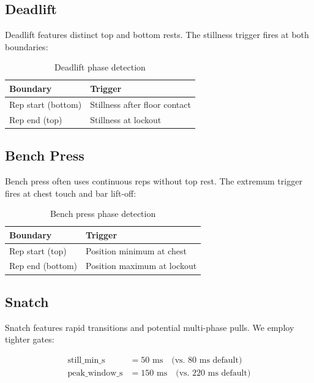 \subsection{Deadlift}

Deadlift features distinct top and bottom rests. The stillness trigger fires at both boundaries:

\begin{table}[h]
    \centering
    \caption{Deadlift phase detection}
    \begin{tabular}{ll}
        \toprule
        \textbf{Boundary} & \textbf{Trigger} \\
        \midrule
        Rep start (bottom) & Stillness after floor contact \\
        Rep end (top) & Stillness at lockout \\
        \bottomrule
    \end{tabular}
\end{table}

\subsection{Bench Press}

Bench press often uses continuous reps without top rest. The extremum trigger fires at chest touch and bar lift-off:

\begin{table}[h]
    \centering
    \caption{Bench press phase detection}
    \begin{tabular}{ll}
        \toprule
        \textbf{Boundary} & \textbf{Trigger} \\
        \midrule
        Rep start (top) & Position minimum at chest \\
        Rep end (bottom) & Position maximum at lockout \\
        \bottomrule
    \end{tabular}
\end{table}

\subsection{Snatch}

Snatch features rapid transitions and potential multi-phase pulls. We employ tighter gates:

\begin{align}
    \text{still\_min\_s} &= 50 \text{ ms} \quad \text{(vs. 80 ms default)} \\
    \text{peak\_window\_s} &= 150 \text{ ms} \quad \text{(vs. 220 ms default)}
\end{align}

